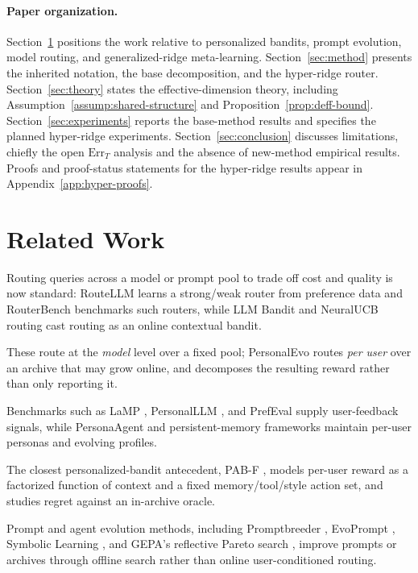 \documentclass{article} %
\begin{document}
\paragraph{Paper organization.}
Section~\ref{sec:related} positions the work relative to personalized bandits, prompt evolution, model routing, and generalized-ridge meta-learning. Section~\ref{sec:method} presents the inherited notation, the base decomposition, and the hyper-ridge router. Section~\ref{sec:theory} states the effective-dimension theory, including Assumption~\ref{assump:shared-structure} and Proposition~\ref{prop:deff-bound}. Section~\ref{sec:experiments} reports the base-method results and specifies the planned hyper-ridge experiments. Section~\ref{sec:conclusion} discusses limitations, chiefly the open $\mathrm{Err}_T$ analysis and the absence of new-method empirical results. Proofs and proof-status statements for the hyper-ridge results appear in Appendix~\ref{app:hyper-proofs}.

\section{Related Work}

\label{sec:related}

Routing queries across a model or prompt pool to trade off cost and quality is now standard: RouteLLM \citep{ong2024routellm} learns a strong/weak router from preference data and RouterBench \citep{hu2024routerbench} benchmarks such routers, while LLM Bandit \citep{li2025llmbandit} and NeuralUCB routing \citep{tsai2026neuralucb} cast routing as an online contextual bandit.

These route at the \emph{model} level over a fixed pool; PersonalEvo routes \emph{per user} over an archive that may grow online, and decomposes the resulting reward rather than only reporting it.

Benchmarks such as LaMP \citep{salemi2023lamp}, PersonalLLM \citep{zollo2024personalllm}, and PrefEval \citep{zhao2025prefeval} supply user-feedback signals, while PersonaAgent \citep{zhang2025personaagent} and persistent-memory frameworks \citep{westhausser2025persistent} maintain per-user personas and evolving profiles.

The closest personalized-bandit antecedent, PAB-F \citep{jin2026personalizing}, models per-user reward as a factorized function of context and a fixed memory/tool/style action set, and studies regret against an in-archive oracle.

Prompt and agent evolution methods, including Promptbreeder \citep{fernando2023promptbreeder}, EvoPrompt \citep{guo2024evoprompt}, Symbolic Learning \citep{zhou2024symbolic}, and GEPA's reflective Pareto search \citep{agrawal2025geparp}, improve prompts or archives through offline search rather than online user-conditioned routing.
\end{document}
